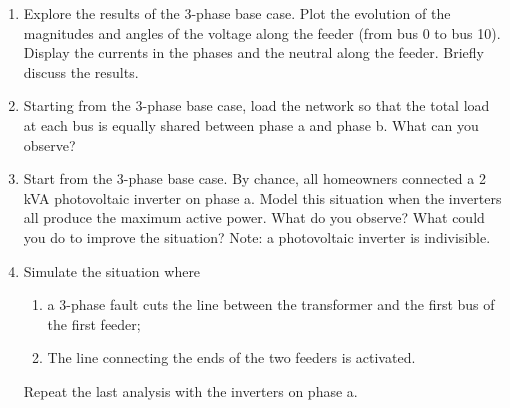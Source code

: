 \documentclass[a4paper]{article}
\begin{document}
\begin{enumerate}
\begin{enumerate}
\item Using the function \lstinline{pp.create_asymmetric_load}, load the system so that you are \textbf{in the same conditions than in the base case }(with the \textbf{single-phase equivalent }). Use star (or wye) connected loads.
\item Add the following commands to run the power flow\footnote{Again, no need to understand everything, it is required to make it work.}:
\begin{lstlisting}[language=Python, caption=Running a three-phase power flow analysis.]
net.ext_grid['s_sc_max_mva'] = 1000
net.ext_grid['rx_max'] = 0.1
pp.add_zero_impedance_parameters(net)
pp.pf.runpp_3ph.runpp_3ph(net, algorithm='nr', calculate_voltage_angles=True)
\end{lstlisting}
\item If it succeeds, you can now access the results in the \lstinline|net| object (e.g. \lstinline{net.res_bus_3ph.vm_a_pu}).
\end{enumerate}
\item Explore the results of the 3-phase base case. Plot the evolution of the magnitudes and angles of the voltage along the feeder (from bus 0 to bus 10). Display the currents in the phases and the neutral along the feeder. Briefly discuss the results.
\item Starting from the 3-phase base case, load the network so that the total load at each bus is equally shared between phase a and phase b. What can you observe?
\item Start from the 3-phase base case. By chance, all homeowners connected a 2 kVA photovoltaic inverter on phase a. Model this situation when the inverters all produce the maximum active power. What do you observe? What could you do to improve the situation? Note: a photovoltaic inverter is indivisible.
\item Simulate the situation where 
\begin{enumerate}
    \item a 3-phase fault cuts the line between the transformer and the first bus of the first feeder; 
    \item The line connecting the ends of the two feeders is activated.
\end{enumerate}
Repeat the last analysis with the inverters on phase a.
\end{enumerate}
\end{document}
